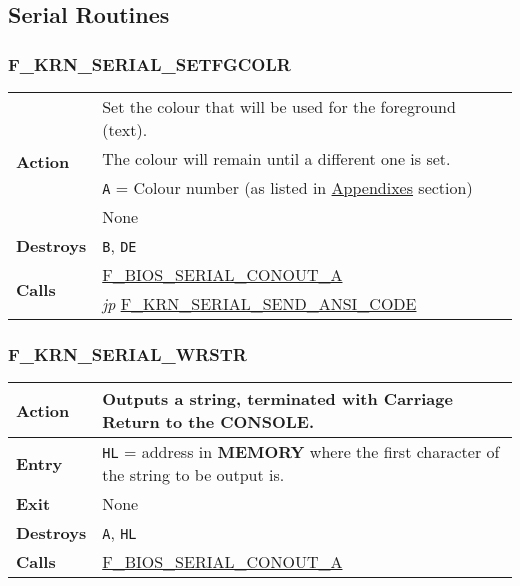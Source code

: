 \subsection{Serial Routines}

    \subsubsection{F\_KRN\_SERIAL\_SETFGCOLR}
    \label{func:fkrnserialsetfgcolr}
    \begin{tabular}{l p{15cm}}
        \hline\multirow[t]{4}{4em}{\textbf{Action}}
        & Set the colour that will be used for the foreground (text). \\
        & The colour will remain until a different one is set. \\
        \hline\textbf{Entry} & \texttt{A} = Colour number (as listed in 
        \hyperref[sec:appendixes]{Appendixes} section) \\
        \hline\textbf{Exit} & None \\
        \hline\textbf{Destroys} & \texttt{B}, \texttt{DE} \\
        \hline\multirow[t]{2}{4em}{\textbf{Calls}} 
        & \hyperref[func:fbiosserialconouta]{F\_BIOS\_SERIAL\_CONOUT\_A}\\
        & \textit{jp} \hyperref[func:fkrnserialsendansicode]{F\_KRN\_SERIAL\_SEND\_ANSI\_CODE}\\
        \hline
    \end{tabular}

    \subsubsection{F\_KRN\_SERIAL\_WRSTR}
    \label{func:fkrnserialwrstr}
    \begin{tabular}{l p{15cm}}
        \hline\multirow[t]{4}{4em}{\textbf{Action}}
        & Outputs a string, terminated with Carriage Return to the 
        \textbf{CONSOLE}.\\
        \hline\textbf{Entry} 
        & \texttt{HL} = address in \textbf{MEMORY} where the first character
        of the string to be output is.\\
        \hline\textbf{Exit} & None \\
        \hline\textbf{Destroys} & \texttt{A}, \texttt{HL} \\
        \hline\textbf{Calls}
        & \hyperref[func:fbiosserialconouta]{F\_BIOS\_SERIAL\_CONOUT\_A}\\
        \hline
    \end{tabular}

